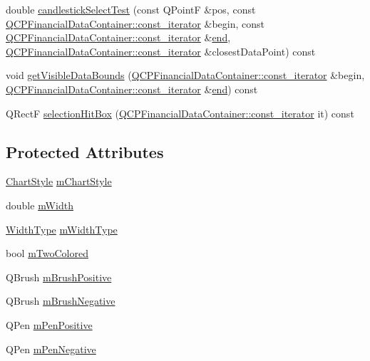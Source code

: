 \begin{DoxyCompactItemize}
\item 
double \mbox{\hyperlink{class_q_c_p_financial_a9783e91a33fd08a402b1a3821d43e471}{candlestick\+Select\+Test}} (const Q\+PointF \&pos, const \mbox{\hyperlink{class_q_c_p_data_container_ae40a91f5cb0bcac61d727427449b7d15}{Q\+C\+P\+Financial\+Data\+Container\+::const\+\_\+iterator}} \&begin, const \mbox{\hyperlink{class_q_c_p_data_container_ae40a91f5cb0bcac61d727427449b7d15}{Q\+C\+P\+Financial\+Data\+Container\+::const\+\_\+iterator}} \&\mbox{\hyperlink{myutils_8h_a64d77caddefed4b96fa62e3f5f73c9a2}{end}}, \mbox{\hyperlink{class_q_c_p_data_container_ae40a91f5cb0bcac61d727427449b7d15}{Q\+C\+P\+Financial\+Data\+Container\+::const\+\_\+iterator}} \&closest\+Data\+Point) const
\item 
void \mbox{\hyperlink{class_q_c_p_financial_a31a3dda8b6b9a5b674e28f1daeb21a75}{get\+Visible\+Data\+Bounds}} (\mbox{\hyperlink{class_q_c_p_data_container_ae40a91f5cb0bcac61d727427449b7d15}{Q\+C\+P\+Financial\+Data\+Container\+::const\+\_\+iterator}} \&begin, \mbox{\hyperlink{class_q_c_p_data_container_ae40a91f5cb0bcac61d727427449b7d15}{Q\+C\+P\+Financial\+Data\+Container\+::const\+\_\+iterator}} \&\mbox{\hyperlink{myutils_8h_a64d77caddefed4b96fa62e3f5f73c9a2}{end}}) const
\item 
Q\+RectF \mbox{\hyperlink{class_q_c_p_financial_afbe9e8cb0de3e9e789a9668b29cad098}{selection\+Hit\+Box}} (\mbox{\hyperlink{class_q_c_p_data_container_ae40a91f5cb0bcac61d727427449b7d15}{Q\+C\+P\+Financial\+Data\+Container\+::const\+\_\+iterator}} it) const
\end{DoxyCompactItemize}
\subsection*{Protected Attributes}
\begin{DoxyCompactItemize}
\item 
\mbox{\hyperlink{class_q_c_p_financial_a0f800e21ee98d646dfc6f8f89d10ebfb}{Chart\+Style}} \mbox{\hyperlink{class_q_c_p_financial_ab65c2ce8d6354451870bb44b894c1e92}{m\+Chart\+Style}}
\item 
double \mbox{\hyperlink{class_q_c_p_financial_af630e5eb8485146b9c777e63fd1cf993}{m\+Width}}
\item 
\mbox{\hyperlink{class_q_c_p_financial_aef1761dda71a53dc5269685e9e492626}{Width\+Type}} \mbox{\hyperlink{class_q_c_p_financial_a7926204997e04c9de9dbe1f092df125a}{m\+Width\+Type}}
\item 
bool \mbox{\hyperlink{class_q_c_p_financial_a6afe919190b884d9bac026cefcc8c0a8}{m\+Two\+Colored}}
\item 
Q\+Brush \mbox{\hyperlink{class_q_c_p_financial_ab7e6eed16260a2f88ca6bd940dffea79}{m\+Brush\+Positive}}
\item 
Q\+Brush \mbox{\hyperlink{class_q_c_p_financial_acb0e31874b7a1deb56bd42e8ab3e68f2}{m\+Brush\+Negative}}
\item 
Q\+Pen \mbox{\hyperlink{class_q_c_p_financial_aa6599186f417ba615caebb3f6c762bd8}{m\+Pen\+Positive}}
\item 
Q\+Pen \mbox{\hyperlink{class_q_c_p_financial_a263fbfefde2cc19c8d4024a8319c2bbb}{m\+Pen\+Negative}}
\end{DoxyCompactItemize}
